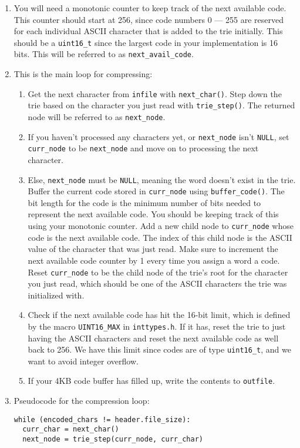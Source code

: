 \documentclass{article}
\begin{document}
\begin{enumerate}
    \item You will need a monotonic counter to keep track of the next available
        code. This counter should start at 256, since code numbers 0 --- 255
        are reserved for each individual ASCII character that is added to the
        trie initially. This should be a \texttt{uint16\_t} since the largest
        code in your implementation is 16 bits. This will be referred to as
        \texttt{next\_avail\_code}.
    \item This is the main loop for compressing:
        \begin{enumerate}
            \item Get the next character from \texttt{infile} with
                \texttt{next\_char()}. Step down the trie based on the
                character you just read with \texttt{trie\_step()}.
                The returned node will be referred to as \texttt{next\_node}.
            \item If you haven't processed any characters yet, or
                \texttt{next\_node} isn't \texttt{NULL}, set \texttt{curr\_node}
                to be \texttt{next\_node} and move on to processing the next
                character.
            \item Else, \texttt{next\_node} must be \texttt{NULL}, meaning the
                word doesn't exist in the trie. Buffer the current code stored
                in \texttt{curr\_node} using \texttt{buffer\_code()}. The bit
                length for the code is the minimum number of bits needed to
                represent the next available code. You should be keeping
                track of this using your monotonic counter. Add a new child node
                to \texttt{curr\_node} whose code is the next available code.
                The index of this child node is the ASCII value of the character
                that was just read. Make sure to increment the next available
                code counter by 1 every time you assign a word a code.
                Reset \texttt{curr\_node} to be the child node of the trie's
                root for the character you just read, which should be one of the
                ASCII characters the trie was initialized with.
            \item Check if the next available code has hit the 16-bit limit,
                which is defined by the macro \texttt{UINT16\_MAX} in
                \texttt{inttypes.h}. If it has, reset the trie to just having
                the ASCII characters and reset the next available code as well
                back to 256. We have this limit since codes are of type
                \texttt{uint16\_t}, and we want to avoid integer overflow.
            \item If your 4KB code buffer has filled up, write the contents to
                \texttt{outfile}.
        \end{enumerate}
    \item Pseudocode for the compression loop:
\begin{lstlisting}
while (encoded_chars != header.file_size):
  curr_char = next_char()
  next_node = trie_step(curr_node, curr_char)


\end{lstlisting}
\end{enumerate}
\end{document}
